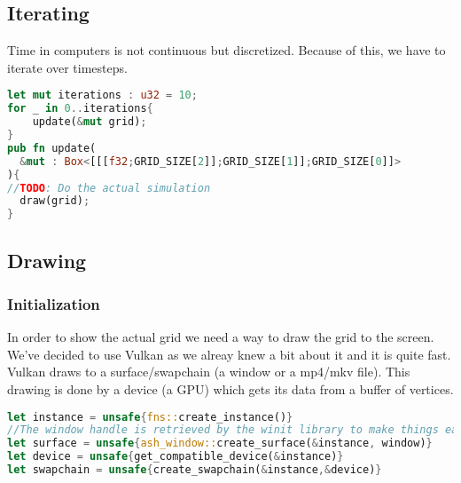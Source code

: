 \documentclass{article}
\begin{document}
\subsection{Iterating}
Time in computers is not continuous but discretized. Because of this, we have to iterate over timesteps.
\begin{lstlisting}[language=Rust, style=boxed]
let mut iterations : u32 = 10;
for _ in 0..iterations{
    update(&mut grid);
}
pub fn update(
  &mut : Box<[[[f32;GRID_SIZE[2]];GRID_SIZE[1]];GRID_SIZE[0]]>
){
//TODO: Do the actual simulation
  draw(grid);
}
\end{lstlisting}
\subsection{Drawing}
\subsubsection{Initialization}
In order to show the actual grid we need a way to draw the grid to the screen. We've decided to use Vulkan as we alreay knew a bit about it and it is quite fast.\cite{Vulkan} Vulkan draws to a surface/swapchain (a window or a mp4/mkv file). This drawing is done by a device (a GPU) which gets its data from a buffer of vertices.
\begin{lstlisting}[language=Rust, style=boxed]
let instance = unsafe{fns::create_instance()}
//The window handle is retrieved by the winit library to make things easier
let surface = unsafe{ash_window::create_surface(&instance, window)}
let device = unsafe{get_compatible_device(&instance)}
let swapchain = unsafe{create_swapchain(&instance,&device)}
\end{lstlisting}


\newpage
\end{document}
